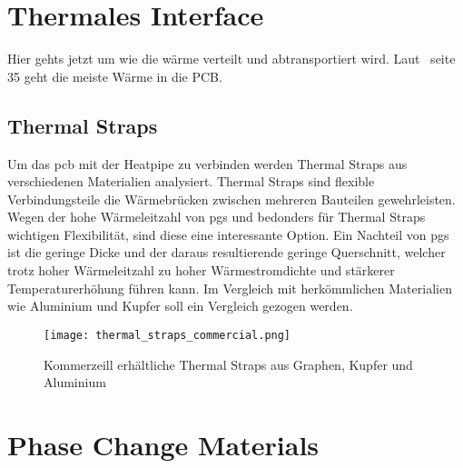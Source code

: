 \section{Thermales Interface}\label{thermalesInterface}

Hier gehts jetzt um wie die wärme verteilt und abtransportiert wird. Laut~\cite{Xingcun-2011} seite 35 geht die meiste Wärme in die PCB.

\newpage

\subsection{Thermal Straps}\label{thermalstraps}

Um das \ac{pcb} mit der Heatpipe zu verbinden werden Thermal Straps aus verschiedenen Materialien analysiert.
Thermal Straps sind flexible Verbindungsteile die Wärmebrücken zwischen mehreren Bauteilen gewehrleisten.
Wegen der hohe Wärmeleitzahl von \ac{pgs} und bedonders für Thermal Straps wichtigen Flexibilität, sind diese eine interessante Option.
Ein Nachteil von \ac{pgs} ist die geringe Dicke und der daraus resultierende geringe Querschnitt, welcher trotz hoher Wärmeleitzahl zu hoher Wärmestromdichte und stärkerer Temperaturerhöhung führen kann.
Im Vergleich mit herkömmlichen Materialien wie Aluminium und Kupfer soll ein Vergleich gezogen werden.

\begin{figure}[H]
  \centering
  \texttt{[image: thermal\_straps\_commercial.png]}
  \caption{Kommerzeill erhältliche Thermal Straps aus Graphen, Kupfer und Aluminium~\cite{Thermal-Straps}}\label{fig:thermalstraps_commercial}
\end{figure}

\section{Phase Change Materials}\label{sec:pcm}

